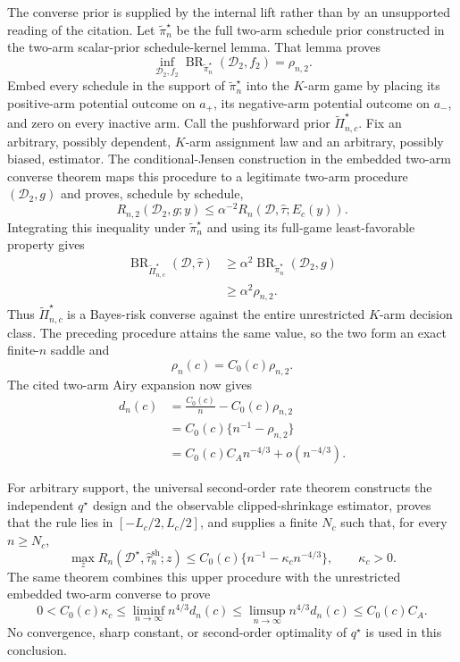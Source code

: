 The converse prior is supplied by the internal lift rather than by an unsupported reading of the citation. Let \(\widetilde\pi_n^\star\) be the full two-arm schedule prior constructed in the two-arm scalar-prior schedule-kernel lemma. That lemma proves
\[
 \inf_{\mathcal D_2,f_2}
 \operatorname{BR}_{\widetilde\pi_n^\star}(\mathcal D_2,f_2)
 =\rho_{n,2}.
\]
Embed every schedule in the support of \(\widetilde\pi_n^\star\) into the \(K\)-arm game by placing its positive-arm potential outcome on \(a_+\), its negative-arm potential outcome on \(a_-\), and zero on every inactive arm. Call the pushforward prior \(\widetilde\Pi_{n,c}^\star\). Fix an arbitrary, possibly dependent, \(K\)-arm assignment law and an arbitrary, possibly biased, estimator. The conditional-Jensen construction in the embedded two-arm converse theorem maps this procedure to a legitimate two-arm procedure \((\mathcal D_2,g)\) and proves, schedule by schedule,
\[
 R_{n,2}(\mathcal D_2,g;y)
 \leq \alpha^{-2}R_n(\mathcal D,\widehat\tau;E_c(y)).
\]
Integrating this inequality under \(\widetilde\pi_n^\star\) and using its full-game least-favorable property gives
\[
 \begin{aligned}
 \operatorname{BR}_{\widetilde\Pi_{n,c}^\star}(\mathcal D,\widehat\tau)
 &\geq \alpha^2
 \operatorname{BR}_{\widetilde\pi_n^\star}(\mathcal D_2,g)\\
 &\geq \alpha^2\rho_{n,2}.
 \end{aligned}
\]
Thus \(\widetilde\Pi_{n,c}^\star\) is a Bayes-risk converse against the entire unrestricted \(K\)-arm decision class. The preceding procedure attains the same value, so the two form an exact finite-\(n\) saddle and
\[
 \rho_n(c)=C_0(c)\rho_{n,2}.
\]
The cited two-arm Airy expansion now gives
\[
 \begin{aligned}
 d_n(c)
 &=\frac{C_0(c)}n-C_0(c)\rho_{n,2}\\
 &=C_0(c)\{n^{-1}-\rho_{n,2}\}\\
 &=C_0(c)C_A n^{-4/3}+o(n^{-4/3}).
 \end{aligned}
\]

For arbitrary support, the universal second-order rate theorem constructs the independent \(q^\star\) design and the observable clipped-shrinkage estimator, proves that the rule lies in \([-L_c/2,L_c/2]\), and supplies a finite \(N_c\) such that, for every \(n\geq N_c\),
\[
 \max_zR_n(\mathcal D^\star,\widehat\tau_n^{\mathrm{sh}};z)
 \leq C_0(c)\{n^{-1}-\kappa_cn^{-4/3}\},
 \qquad \kappa_c>0.
\]
The same theorem combines this upper procedure with the unrestricted embedded two-arm converse to prove
\[
 0<C_0(c)\kappa_c
 \leq\liminf_{n\to\infty}n^{4/3}d_n(c)
 \leq\limsup_{n\to\infty}n^{4/3}d_n(c)
 \leq C_0(c)C_A.
\]
No convergence, sharp constant, or second-order optimality of \(q^\star\) is used in this conclusion.


